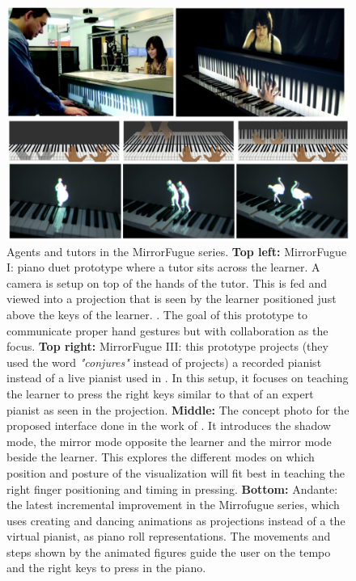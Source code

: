 \documentclass[sigchi, review]{acmart}
\begin{document}
\begin{figure}[t]
    \centering
    \includegraphics[width=18cm]{figures/xiao.png}
    \caption{Agents and tutors in the MirrorFugue series. \textbf{Top left:} MirrorFugue I: piano duet prototype where a tutor sits across the learner. A camera is setup on top of the hands of the tutor. This is fed and viewed into a projection that is seen by the learner positioned just above the keys of the learner. \cite{xiao2010mirrorfugue}. The goal of this prototype to communicate proper hand gestures but with collaboration as the focus. \textbf{Top right:} MirrorFugue III: this prototype \cite{xiao2013mirrorfugue} projects (they used the word \textit{"conjures"} instead of projects) a recorded pianist instead of a live pianist used in \cite{xiao2010mirrorfugue}. In this setup, it focuses on teaching the learner to press the right keys similar to that of an expert pianist as seen in the projection. \textbf{Middle:} The concept photo for the proposed interface done in the work of \cite{xiao2010mirrorfugue}. It introduces the shadow mode, the mirror mode opposite the learner and the mirror mode beside the learner. This explores the different modes on which position and posture of the visualization will fit best in teaching the right finger positioning and timing in pressing.  \textbf{Bottom:} Andante: the latest incremental improvement in the Mirrofugue series, which uses creating and dancing animations as projections instead of a the virtual pianist, as piano roll representations. The movements and steps shown by the animated figures guide the user on the tempo and the right keys to press in the piano. }
    \label{fig:xiao}
\end{figure}
\end{document}

